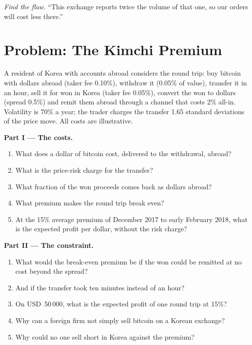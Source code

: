 \begin{exercise}[$\star\star\star$]\label{exo:m3:spot-markets:8}
\emph{Find the flaw.} ``This exchange reports twice the volume of that one, so our orders will cost less there.''
\end{exercise}

\section{Problem: The Kimchi Premium}

\begin{problem}\label{pb:m3:spot-markets:1}
A resident of Korea with accounts abroad considers the round trip: buy bitcoin with dollars abroad (taker fee
0.10\%), withdraw it (0.05\% of value), transfer it in an hour, sell it for won in Korea (taker fee 0.05\%), convert
the won to dollars (spread 0.5\%) and remit them abroad through a channel that costs 2\% all-in. Volatility is 70\%
a year; the trader charges the transfer 1.65 standard deviations of the price move. All costs are illustrative.

\medskip\noindent\textbf{Part I --- The costs.}
\begin{enumerate}
\item What does a dollar of bitcoin cost, delivered to the withdrawal, abroad?
\item What is the price-risk charge for the transfer?
\item What fraction of the won proceeds comes back as dollars abroad?
\item What premium makes the round trip break even?
\item At the 15\% average premium of December 2017 to early February 2018, what is the expected profit per dollar,
without the risk charge?
\end{enumerate}

\medskip\noindent\textbf{Part II --- The constraint.}
\begin{enumerate}[resume]
\item What would the break-even premium be if the won could be remitted at no cost beyond the spread?
\item And if the transfer took ten minutes instead of an hour?
\item On USD~50\,000, what is the expected profit of one round trip at 15\%?
\item Why can a foreign firm not simply sell bitcoin on a Korean exchange?
\item Why could no one sell short in Korea against the premium?
\end{enumerate}


\end{problem}
